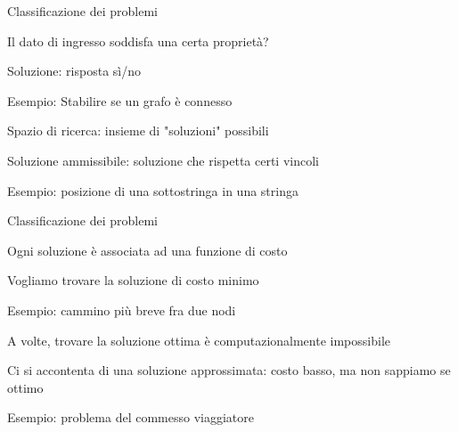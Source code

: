 \begin{frame}{Classificazione dei problemi}

\begin{myboxtitle}
\BIL
\item Il dato di ingresso soddisfa una certa proprietà?
\item Soluzione: risposta sì/no
\item Esempio: Stabilire se un grafo è connesso
\EIL
\end{myboxtitle}
\begin{myboxtitle}
\BIL
\item Spazio di ricerca: insieme di "soluzioni" possibili
\item Soluzione ammissibile: soluzione che rispetta certi vincoli
\item Esempio: posizione di una sottostringa in una stringa
\EIL
\end{myboxtitle}

\end{frame}

\begin{frame}{Classificazione dei problemi}

\begin{myboxtitle}
\BIL
\item Ogni soluzione è associata ad una funzione di costo
\item Vogliamo trovare la soluzione di costo minimo
\item Esempio: cammino più breve fra due nodi
\EIL
\end{myboxtitle}

\begin{myboxtitle}
\BIL
\item A volte, trovare la soluzione ottima è computazionalmente impossibile
\item Ci si accontenta di una soluzione approssimata: costo basso, ma non sappiamo se ottimo
\item Esempio: problema del commesso viaggiatore
\EIL
\end{myboxtitle}

\end{frame}

